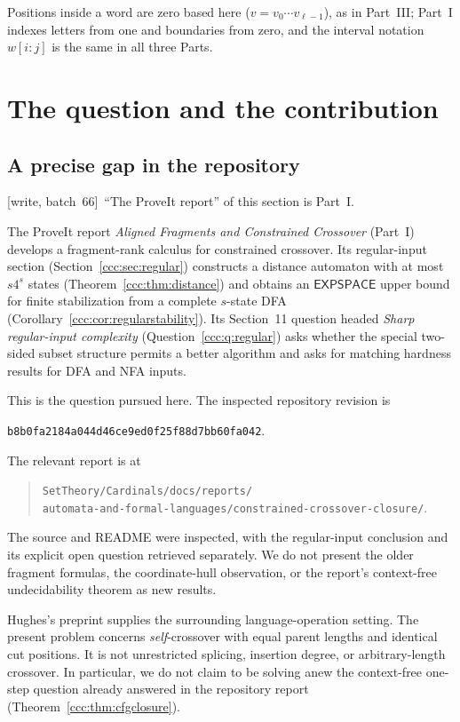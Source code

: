 \documentclass[11pt,letterpaper]{article}
\theoremstyle{definition}
\theoremstyle{remark}
\newcommand{\wsix}{\textup{[write, batch~66]}}
\newcommand{\EXPSPACE}{\mathsf{EXPSPACE}}
\begin{document}
Positions inside a word are zero based here ($v=v_0\cdots v_{\ell-1}$), as in
Part~III; Part~I indexes letters from one and boundaries from zero, and the
interval notation $w[i:j]$ is the same in all three Parts.

\section{The question and the contribution}\label{ccc:ps:sec:intro}

\subsection{A precise gap in the repository}

\wsix\ ``The ProveIt report'' of this section is Part~I.

The ProveIt report \emph{Aligned Fragments and Constrained Crossover}
(Part~I) develops a fragment-rank calculus for constrained crossover.
Its regular-input section (Section~\ref{ccc:sec:regular}) constructs a
distance automaton with at most $s4^s$ states (Theorem~\ref{ccc:thm:distance})
and obtains an $\EXPSPACE$ upper bound for finite stabilization from a
complete $s$-state DFA (Corollary~\ref{ccc:cor:regularstability}). Its
Section~11 question headed \emph{Sharp regular-input complexity}
(Question~\ref{ccc:q:regular}) asks whether the special two-sided subset
structure permits a better algorithm and asks for matching hardness results
for DFA and NFA inputs.

This is the question pursued here. The inspected repository revision is
\begin{center}\small
\nolinkurl{b8b0fa2184a044d46ce9ed0f25f88d7bb60fa042}.
\end{center}
The relevant report is at
\begin{quote}\small
\nolinkurl{SetTheory/Cardinals/docs/reports/}\\
\nolinkurl{automata-and-formal-languages/constrained-crossover-closure/}.
\end{quote}
The source and README were inspected, with the regular-input conclusion and
its explicit open question retrieved separately. We do not present the
older fragment formulas, the coordinate-hull observation, or the report's
context-free undecidability theorem as new results.

Hughes's preprint \cite{Hughes} supplies the surrounding language-operation
setting. The present problem concerns \emph{self}-crossover with equal
parent lengths and identical cut positions. It is not unrestricted
splicing, insertion degree, or arbitrary-length crossover. In particular,
we do not claim to be solving anew the context-free one-step question
already answered in the repository report (Theorem~\ref{ccc:thm:cfgclosure}).
\end{document}
